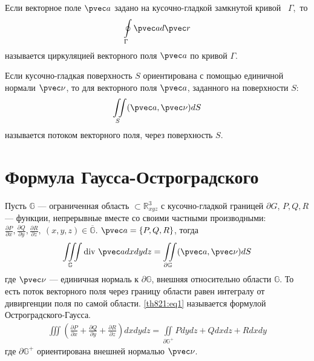 \begin{definition}
  Если векторное поле $\pvec a$ задано на кусочно-гладкой замкнутой кривой~
  $\Gamma$,~то
  \begin{gather*}
    \oint\limits_{\Gamma} \pvec a d \pvec r
  \end{gather*}
  называется циркуляцией
  векторного поля $\pvec a$ по кривой $\Gamma$.
\end{definition}

\begin{definition}
  Если кусочно-гладкая поверхность $S$ ориентирована с помощью единичной
  нормали $\pvec \nu$, то для векторного поля $\pvec a$, заданного на
  поверхности $S$:
  \begin{gather*}
    \iint\limits_S (\pvec a, \pvec \nu) dS
  \end{gather*}
  называется потоком векторного поля, через поверхность $S$.
\end{definition}

\section{Формула Гаусса-Остроградского}
\begin{theorem}
  \label{th821}
  Пусть $\mathbb{G}$ --- ограниченная область $\subset \mathbb{R}^3_{xyz}$
  с кусочно-гладкой границей $\partial G$, $P, Q, R$ --- функции, непрерывные
  вместе со своими частными производными: \\ $\frac{\partial P}{\partial x},
  \frac{\partial Q}{\partial y}, \frac{\partial R}{\partial z}, \ (x, y, z) \in
  \overline{\mathbb{G}}$. $\pvec a = \{P, Q, R\}$, тогда
  \begin{gather}
    \iiint\limits_{\mathbb{G}} \mbox{div} \ \pvec a dx dy dz =
    \iint\limits_{\partial \mathbb{G}} (\pvec a, \pvec \nu) dS
    \label{th821:eq1}
  \end{gather}
  где $\pvec \nu$ --- единичная нормаль к $\partial \mathbb{G}$, внешняя
  относительно области $\mathbb{G}$. То есть поток векторного поля через
  границу области равен интегралу от дивиргенции поля по самой области.
  \eqref{th821:eq1} называется формулой Остроградского-Гаусса.
  \begin{gather}
    \iiint \left( \frac{\partial P}{\partial x} + \frac{\partial Q}{\partial y}
    + \frac{\partial R}{\partial z}\right) dx dy dz = \iint\limits_{\partial
      \mathbb{G}^+} P dy dz + Q dx dz + R dx dy
    \label{th821:eq2}
  \end{gather}
  где $\partial \mathbb{G}^+$ ориентирована внешней нормалью $\pvec \nu$.
\end{theorem}

